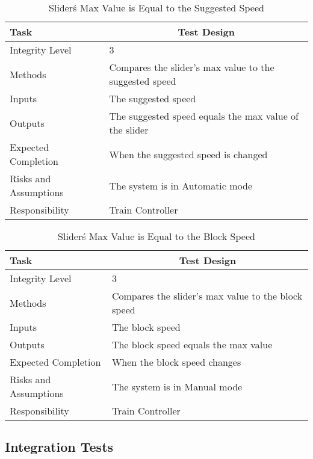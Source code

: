 \documentclass[]{article}
\begin{document}
\begin{table}[H]
	\centering
	\caption{Slider\'s Max Value is Equal to the Suggested Speed}
	\begin{tabular}{|l|l|}
		\hline
		Task & \multicolumn{1}{c|}{Test Design} \\ \hline
		Integrity Level & 3 \\ \hline
		Methods & Compares the slider's max value to the suggested speed\\ \hline
		Inputs & The suggested speed\\ \hline
		Outputs & The suggested speed equals the max value of the slider \\ \hline
		Expected Completion & When the suggested speed is changed\\ \hline
		Risks and Assumptions & The system is in Automatic mode \\ \hline
		Responsibility &  Train Controller\\ \hline
	\end{tabular}
\end{table}

\begin{table}[H]
	\centering
	\caption{Slider\'s Max Value is Equal to the Block Speed}
	\begin{tabular}{|l|l|}
		\hline
		Task & \multicolumn{1}{c|}{Test Design} \\ \hline
		Integrity Level & 3 \\ \hline
		Methods & Compares the slider's max value to the block speed\\ \hline
		Inputs & The block speed\\ \hline
		Outputs & The block speed equals the max value \\ \hline
		Expected Completion & When the block speed changes\\ \hline
		Risks and Assumptions & The system is in Manual mode \\ \hline
		Responsibility &  Train Controller\\ \hline
	\end{tabular}
\end{table}

\subsection{Integration Tests}
\end{document}

